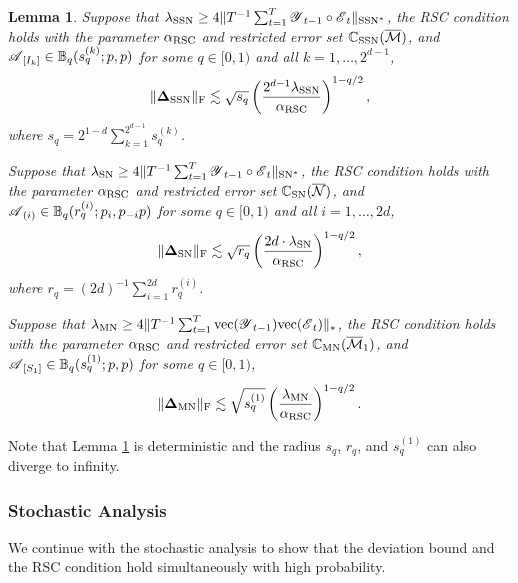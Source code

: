 \documentclass[12pt]{article}
\newtheorem{lemma}{Lemma}
\newcommand{\bm}{\boldsymbol}
\newcommand{\cm}[1]{\mbox{\boldmath$\mathscr{#1}$}}
\begin{document}
\begin{lemma} \label{lemma:errorbound}
	Suppose that $\lambda_{\textup{SSN}}\geq4\|T^{-1}\sum_{t=1}^T\cm{Y}_{t-1}\circ\cm{E}_t\|_{\textup{SSN}^*}$, the RSC condition holds with the parameter $\alpha_{\textup{RSC}}$ and restricted error set $\mathbb{C}_{\textup{SSN}}(\overline{\mathcal{M}})$, and $\cm{A}_{[I_k]}\in\mathbb{B}_q(s_q^{(k)};p,p)$ for some $q\in[0,1)$ and all $k=1,\dots,2^{d-1}$,
	\begin{equation}
	\|\bm{\Delta}_{\textup{SSN}}\|_\textup{F}\lesssim\sqrt{s_q}\left(\frac{2^{d-1}\lambda_{\textup{SSN}}}{\alpha_{\textup{RSC}}}\right)^{1-q/2},
	\end{equation}
	where $s_q=2^{1-d}\sum_{k=1}^{2^{d-1}}s_q^{(k)}$.
		
	Suppose that $\lambda_{\textup{SN}}\geq4\|T^{-1}\sum_{t=1}^T\cm{Y}_{t-1}\circ\cm{E}_t\|_{\textup{SN}^*}$, the RSC condition holds with the parameter $\alpha_{\textup{RSC}}$ and restricted error set $\mathbb{C}_{\textup{SN}}(\overline{\mathcal{N}})$, and $\cm{A}_{(i)}\in\mathbb{B}_q(r_q^{(i)};p_i,p_{-i}p)$ for some $q\in[0,1)$ and all $i=1,\dots,2d$,
	\begin{equation}
	\|\bm{\Delta}_{\textup{SN}}\|_\textup{F}\lesssim\sqrt{r_q}\left(\frac{2d\cdot\lambda_{\textup{SN}}}{\alpha_{\textup{RSC}}}\right)^{1-q/2},
	\end{equation}
	where $r_q=(2d)^{-1}\sum_{i=1}^{2d}r_q^{(i)}$.
	
	Suppose that $\lambda_{\textup{MN}}\geq4\|T^{-1}\sum_{t=1}^T\textup{vec}(\cm{Y}_{t-1})\textup{vec}(\cm{E}_t)\|_{*}$, the RSC condition holds with the parameter $\alpha_{\textup{RSC}}$ and restricted error set $\mathbb{C}_{\textup{MN}}(\overline{\mathcal{M}}_1)$, and $\cm{A}_{[S_1]}\in\mathbb{B}_q(s_q^{(1)};p,p)$ for some $q\in[0,1)$,
	\begin{equation}
	\|\bm{\Delta}_{\textup{MN}}\|_\textup{F}\lesssim\sqrt{s_q^{(1)}}\left(\frac{\lambda_{\textup{MN}}}{\alpha_{\textup{RSC}}}\right)^{1-q/2}.
	\end{equation}
\end{lemma}
Note that Lemma \ref{lemma:errorbound} is deterministic and the radius $s_q$, $r_q$, and $s_q^{(1)}$ can also diverge to infinity.



\subsubsection{Stochastic Analysis \label{subsec:stochastic}}
We continue with the stochastic analysis to show that the deviation bound and the RSC condition hold simultaneously with high probability. 
\end{document}
